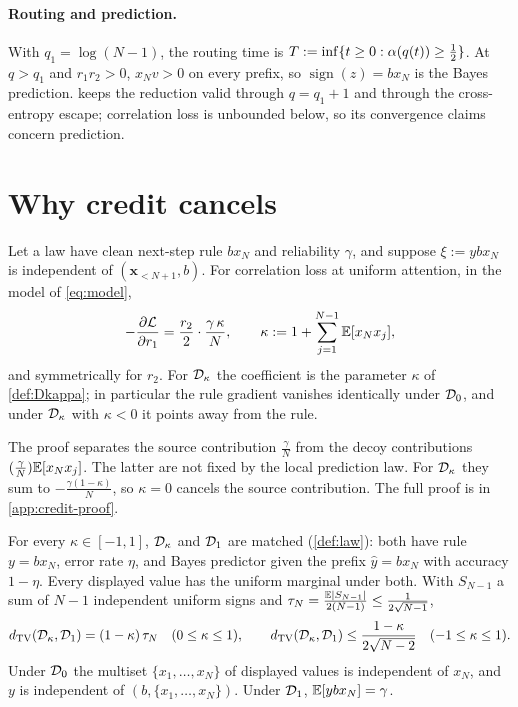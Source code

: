 \paragraph{Routing and prediction.}
With $q_1=\log(N-1)$, the routing time is $T:=\inf\{t\ge0:\alpha(q(t))\ge\tfrac{1}{2}\}$. At $q>q_1$ and $r_1r_2>0$, $x_N v>0$ on every prefix,
so $\operatorname{sign}(z)=b x_N$ is the Bayes prediction.  keeps the reduction valid through $q=q_1+1$ and through the cross-entropy escape;
correlation loss is unbounded below, so its convergence claims concern prediction.

\section{Why credit cancels}
\label{sec:cancel}

\begin{lemma}
\label{lem:credit}
Let a law have clean next-step rule $b x_N$ and reliability $\gamma$, and suppose $\xi:=y b x_N$ is independent of $(\bm x_{<N+1},b)$. For correlation loss at uniform attention, in the model of \cref{eq:model},
\[
 -\frac{\partial \mathcal L}{\partial r_1}=\frac{r_2}{2}\cdot\frac{\gamma\,\kappa}{N},
 \qquad
 \kappa:=1+\sum_{j=1}^{N-1}\mathbb E[x_N x_j],
\]
and symmetrically for $r_2$. For $\mathcal D_{\kappa}$ the coefficient is the parameter $\kappa$ of \cref{def:Dkappa}; in particular the rule gradient vanishes identically
under $\mathcal D_{0}$, and under $\mathcal D_{\kappa}$ with $\kappa<0$ it points away from the rule.
\end{lemma}

The proof separates the source contribution $\tfrac{\gamma}{N}$ from the decoy contributions
$(\tfrac{\gamma}{N})\mathbb E[x_N x_j]$. The latter are not fixed by the local prediction law.
For $\mathcal D_{\kappa}$ they sum to $-\tfrac{\gamma(1-\kappa)}{N}$, so $\kappa=0$ cancels the source contribution.
The full proof is in \cref{app:credit-proof}.

\begin{lemma}
\label{lem:matched}
For every $\kappa\in[-1,1]$, $\mathcal D_{\kappa}$ and $\mathcal D_{1}$ are matched (\cref{def:law}): both have rule $y=b x_N$, error rate $\eta$,
and Bayes predictor given the prefix $\hat y=b x_N$ with accuracy $1-\eta$. Every displayed value has the uniform marginal under both.
With $S_{N-1}$ a sum of $N-1$ independent uniform signs and $\tau_N=\tfrac{\mathbb E|S_{N-1}|}{2(N-1)}\le\tfrac{1}{2\sqrt{N-1}}$,
\[
 d_{\mathrm{TV}}(\mathcal D_{\kappa},\mathcal D_{1})=(1-\kappa)\,\tau_N\quad(0\le\kappa\le1),\qquad
 d_{\mathrm{TV}}(\mathcal D_{\kappa},\mathcal D_{1})\le\frac{1-\kappa}{2\sqrt{N-2}}\quad(-1\le\kappa\le1).
\]
Under $\mathcal D_{0}$ the multiset $\{x_1,\ldots,x_N\}$ of displayed values is independent of $x_N$, and $y$ is independent of
$(b,\{x_1,\ldots,x_N\})$. Under $\mathcal D_{1}$, $\mathbb E[y b x_N]=\gamma$.
\end{lemma}

